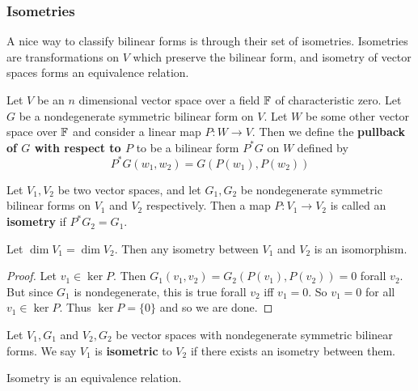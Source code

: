 \subsubsection{Isometries} 
A nice way to classify bilinear forms is through their set of isometries. Isometries are transformations on $V$ which preserve the bilinear form, and isometry of vector spaces forms an equivalence relation.
\begin{defn} Let $V$ be an $n$ dimensional vector space over a field $\operatorname{\mathbb{F}}$ of characteristic zero. Let $G$ be a nondegenerate symmetric bilinear form on $V$. Let $W$ be some other vector space over $\operatorname{\mathbb{F}}$ and consider a linear map $P : W\to V$. Then we define the \textbf{pullback of $G$ with respect to $P$} to be a bilinear form $P^* G$ on $W$ defined by 
\begin{equation}P^* G(w_1,w_2) = G(P(w_1),P(w_2))\end{equation}
\end{defn}
\begin{defn}[Isometry] Let $V_1,V_2$ be two vector spaces, and let $G_1,G_2$ be nondegenerate symmetric bilinear forms on $V_1$ and $V_2$ respectively. Then a map $P : V_1 \to V_2$ is called an \textbf{isometry} if $P^* G_2 = G_1$. 
\end{defn}
\begin{lemma}
    Let $\dim V_1 = \dim V_2$. Then any isometry between $V_1$ and $V_2$ is an isomorphism.
\end{lemma}
\begin{proof}
     Let $v_1\in \ker P$. Then $G_1(v_1,v_2) = G_2(P(v_1),P(v_2))=0$ forall $v_2$. But since $G_1$ is nondegenerate, this is true forall $v_2$ iff $v_1 = 0$. So $v_1=0$ for all $v_1 \in \ker P$. Thus $\ker P = \{0\}$ and so we are done.
\end{proof}
\begin{defn}
    Let $V_1,G_1$ and $V_2,G_2$ be vector spaces with nondegenerate symmetric bilinear forms. We say $V_1$ is \textbf{isometric} to $V_2$ if there exists an isometry between them.
\end{defn}
\begin{remark*}
    Isometry is an equivalence relation.
\end{remark*}

